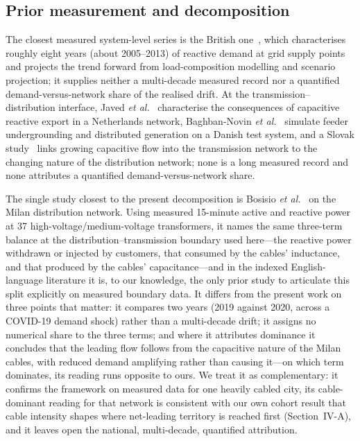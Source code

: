 \documentclass[journal]{IEEEtran}
\begin{document}
\subsection{Prior measurement and decomposition}
The closest measured system-level series is the British one~\cite{kaloudas2014,
kaloudas2017}, which characterises roughly eight years (about 2005--2013) of
reactive demand at grid supply points and projects the trend forward from
load-composition modelling and scenario projection; it supplies neither a
multi-decade measured record nor a quantified demand-versus-network share of
the realised drift. At the transmission--distribution interface, Javed
\emph{et al.}~\cite{javed2024} characterise the consequences of capacitive
reactive export in a Netherlands network, Baghban-Novin \emph{et
al.}~\cite{baghbannovin2020} simulate feeder undergrounding and distributed
generation on a Danish test system, and a Slovak study~\cite{tazky2021} links
growing capacitive flow into the transmission network to the changing nature
of the distribution network; none is a long measured record and none
attributes a quantified demand-versus-network share.

The single study closest to the present decomposition is Bosisio \emph{et
al.}~\cite{bosisio2022} on the Milan distribution network. Using measured
15-minute active and reactive power at 37 high-voltage/medium-voltage
transformers, it names the same three-term balance at the
distribution--transmission boundary used here---the reactive power withdrawn or
injected by customers, that consumed by the cables' inductance, and that
produced by the cables' capacitance---and in the indexed English-language
literature it is, to our knowledge, the only prior study to articulate this
split explicitly on measured boundary data. It differs from the present work
on three points that matter: it compares two years (2019 against 2020, across
a COVID-19 demand shock) rather than a multi-decade drift; it assigns no
numerical share to the three terms; and where it attributes dominance it
concludes that the leading flow follows from the capacitive nature of the
Milan cables, with reduced demand amplifying rather than causing it---on which
term dominates, its reading runs opposite to ours. We treat it as
complementary: it confirms the framework on measured data for one heavily
cabled city, its cable-dominant reading for that network is consistent with
our own cohort result that cable intensity shapes where net-leading territory
is reached first (Section~IV-A), and it leaves open the national,
multi-decade, quantified attribution.
\end{document}
